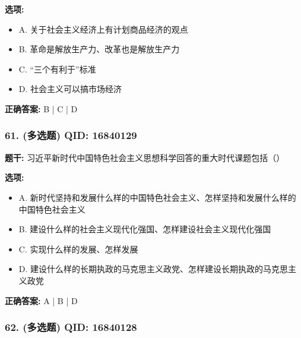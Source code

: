 \documentclass[12pt,UTF8]{ctexart}
\begin{document}
\textbf{选项:}
\begin{itemize}[leftmargin=*]

  \item A. 关于社会主义经济上有计划商品经济的观点

  \item B. 革命是解放生产力、改革也是解放生产力

  \item C. “三个有利于”标准

  \item D. 社会主义可以搞市场经济

\end{itemize}

\textbf{正确答案:}
B | C | D

\vspace{0.3em}\hrulefill\vspace{0.7em}

\subsubsection*{61. (多选题) \small QID: 16840129}

\textbf{题干:}
习近平新时代中国特色社会主义思想科学回答的重大时代课题包括（）

\textbf{选项:}
\begin{itemize}[leftmargin=*]

  \item A. 新时代坚持和发展什么样的中国特色社会主义、怎样坚持和发展什么样的中国特色社会主义

  \item B. 建设什么样的社会主义现代化强国、怎样建设社会主义现代化强国

  \item C. 实现什么样的发展、怎样发展

  \item D. 建设什么样的长期执政的马克思主义政党、怎样建设长期执政的马克思主义政党

\end{itemize}

\textbf{正确答案:}
A | B | D

\vspace{0.3em}\hrulefill\vspace{0.7em}

\subsubsection*{62. (多选题) \small QID: 16840128}
\end{document}
